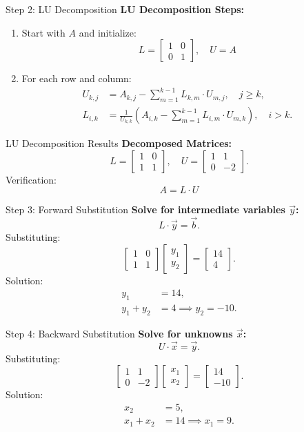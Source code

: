 \documentclass{beamer}
\newcommand{\myvec}[1]{\begin{bmatrix}#1\end{bmatrix}}
\begin{document}
\begin{frame}{Step 2: LU Decomposition}
\textbf{LU Decomposition Steps:}
\begin{enumerate}
    \item Start with $A$ and initialize:
        \[
        L = \myvec{1 & 0 \\ 0 & 1}, \quad U = A
        \]
    \item For each row and column:
        \begin{align*}
        U_{k,j} &= A_{k,j} - \sum_{m=1}^{k-1} L_{k,m} \cdot U_{m,j}, \quad j \geq k, \\
        L_{i,k} &= \frac{1}{U_{k,k}} \left( A_{i,k} - \sum_{m=1}^{k-1} L_{i,m} \cdot U_{m,k} \right), \quad i > k.
        \end{align*}
\end{enumerate}
\end{frame}

\begin{frame}{LU Decomposition Results}
\textbf{Decomposed Matrices:}
\[
L = \myvec{1 & 0 \\ 1 & 1}, \quad U = \myvec{1 & 1 \\ 0 & -2}.
\]
Verification:
\[
    A = L \cdot U
\]
\end{frame}

\begin{frame}{Step 3: Forward Substitution}
\textbf{Solve for intermediate variables \(\vec{y}\):}
\[
L \cdot \vec{y} = \vec{b}.
\]
Substituting:
\[
\myvec{1 & 0 \\ 1 & 1}\myvec{y_1 \\ y_2} = \myvec{14 \\ 4}.
\]
Solution:
\begin{align*}
    y_1 &= 14, \\
    y_1 + y_2 &= 4 \implies y_2 = -10.
\end{align*}
\end{frame}

\begin{frame}{Step 4: Backward Substitution}
\textbf{Solve for unknowns \(\vec{x}\):}
\[
U \cdot \vec{x} = \vec{y}.
\]
Substituting:
\[
\myvec{1 & 1 \\ 0 & -2}\myvec{x_1 \\ x_2} = \myvec{14 \\ -10}.
\]
Solution:
\begin{align*}
    x_2 &= 5, \\
    x_1 + x_2 &= 14 \implies x_1 = 9.
\end{align*}
\end{frame}
\end{document}
